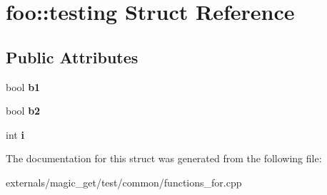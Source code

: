\hypertarget{structfoo_1_1testing}{}\section{foo\+:\+:testing Struct Reference}
\label{structfoo_1_1testing}
\subsection*{Public Attributes}
\begin{DoxyCompactItemize}
\item 
\mbox{\label{structfoo_1_1testing_a85305eff45b546fbb1dfef1ae18d4fd9}} 
bool {\bfseries b1}
\item 
\mbox{\label{structfoo_1_1testing_aa706c40ebdacf1e09959e51b8b22e469}} 
bool {\bfseries b2}
\item 
\mbox{\label{structfoo_1_1testing_acdc16b2e34fb1df38d52772f928de7c3}} 
int {\bfseries i}
\end{DoxyCompactItemize}


The documentation for this struct was generated from the following file\+:\begin{DoxyCompactItemize}
\item 
externals/magic\+\_\+get/test/common/functions\+\_\+for.\+cpp\end{DoxyCompactItemize}
